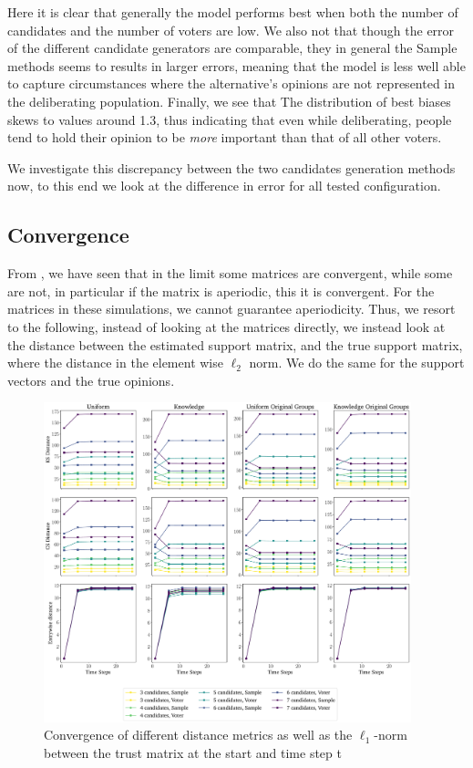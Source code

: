 Here it is clear that generally the model performs best when both the number of
candidates and the number of voters are low. We also not that though the error
of the different candidate generators are comparable, they in general the
Sample methods seems to results in larger errors, meaning that the model is
less well able to capture circumstances where the alternative's opinions are
not represented in the deliberating population. Finally, we see that The
distribution of best biases skews to values around 1.3, thus indicating that
even while deliberating, people tend to hold their opinion to be \textit{more}
important than that of all other voters.

We investigate this discrepancy between the two candidates generation methods
now, to this end we look at the difference in error for all tested
configuration.


\subsection{Convergence}

From , we have seen that in the limit some matrices are
convergent, while some are not, in particular if the matrix is aperiodic, this
it is convergent. For the matrices in these simulations, we cannot guarantee
aperiodicity. Thus, we resort to the following, instead of looking at the
matrices directly, we instead look at the distance between the estimated
support matrix, and the true support matrix, where the distance in the element
wise $\ell_2$ norm. We do the same for the support vectors and the true
opinions.

\begin{figure}
	\begin{center}
		\includegraphics[width=0.95\textwidth]{Figures/convergence_groups.pdf}
	\end{center}
	\caption{Convergence of different distance metrics as well as the
		$\ell_1$-norm between the trust matrix at the start and time step
		t}\label{fig:convergence_big}
\end{figure}



